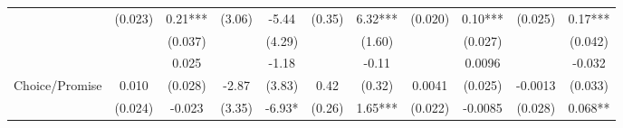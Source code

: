 \begin{tabular}{rrrrrrrrrrr}
\cmidrule{3-3}\cmidrule{5-5}\cmidrule{7-7}\cmidrule{9-9}\cmidrule{11-11}\multicolumn{1}{l}{} & \multicolumn{1}{c}{(0.023)} & \multicolumn{1}{c}{\cellcolor[rgb]{ .816,  .808,  .808} 0.21***} & \multicolumn{1}{c}{(3.06)} & \multicolumn{1}{c}{\cellcolor[rgb]{ .816,  .808,  .808} -5.44} & \multicolumn{1}{c}{(0.35)} & \multicolumn{1}{c}{\cellcolor[rgb]{ .816,  .808,  .808} 6.32***} & \multicolumn{1}{c}{(0.020)} & \multicolumn{1}{c}{\cellcolor[rgb]{ .816,  .808,  .808} 0.10***} & \multicolumn{1}{c}{(0.025)} & \multicolumn{1}{c}{\cellcolor[rgb]{ .816,  .808,  .808} 0.17***} \\
      &       & \multicolumn{1}{c}{\cellcolor[rgb]{ .816,  .808,  .808} (0.037)} &       & \multicolumn{1}{c}{\cellcolor[rgb]{ .816,  .808,  .808} (4.29)} &       & \multicolumn{1}{c}{\cellcolor[rgb]{ .816,  .808,  .808} (1.60)} &       & \multicolumn{1}{c}{\cellcolor[rgb]{ .816,  .808,  .808} (0.027)} &       & \multicolumn{1}{c}{\cellcolor[rgb]{ .816,  .808,  .808} (0.042)} \\
      &       & \multicolumn{1}{c}{\cellcolor[rgb]{ .949,  .949,  .949} 0.025} &       & \multicolumn{1}{c}{\cellcolor[rgb]{ .949,  .949,  .949} -1.18} &       & \multicolumn{1}{c}{\cellcolor[rgb]{ .949,  .949,  .949} -0.11} &       & \multicolumn{1}{c}{\cellcolor[rgb]{ .949,  .949,  .949} 0.0096} &       & \multicolumn{1}{c}{\cellcolor[rgb]{ .949,  .949,  .949} -0.032} \\
\multicolumn{1}{l}{Choice/Promise} & \multicolumn{1}{c}{0.010} & \multicolumn{1}{c}{\cellcolor[rgb]{ .949,  .949,  .949} (0.028)} & \multicolumn{1}{c}{-2.87} & \multicolumn{1}{c}{\cellcolor[rgb]{ .949,  .949,  .949} (3.83)} & \multicolumn{1}{c}{0.42} & \multicolumn{1}{c}{\cellcolor[rgb]{ .949,  .949,  .949} (0.32)} & \multicolumn{1}{c}{0.0041} & \multicolumn{1}{c}{\cellcolor[rgb]{ .949,  .949,  .949} (0.025)} & \multicolumn{1}{c}{-0.0013} & \multicolumn{1}{c}{\cellcolor[rgb]{ .949,  .949,  .949} (0.033)} \\
\cmidrule{3-3}\cmidrule{5-5}\cmidrule{7-7}\cmidrule{9-9}\cmidrule{11-11}\multicolumn{1}{l}{} & \multicolumn{1}{c}{(0.024)} & \multicolumn{1}{c}{\cellcolor[rgb]{ .816,  .808,  .808} -0.023} & \multicolumn{1}{c}{(3.35)} & \multicolumn{1}{c}{\cellcolor[rgb]{ .816,  .808,  .808} -6.93*} & \multicolumn{1}{c}{(0.26)} & \multicolumn{1}{c}{\cellcolor[rgb]{ .816,  .808,  .808} 1.65***} & \multicolumn{1}{c}{(0.022)} & \multicolumn{1}{c}{\cellcolor[rgb]{ .816,  .808,  .808} -0.0085} & \multicolumn{1}{c}{(0.028)} & \multicolumn{1}{c}{\cellcolor[rgb]{ .816,  .808,  .808} 0.068**} \\

\end{tabular}

